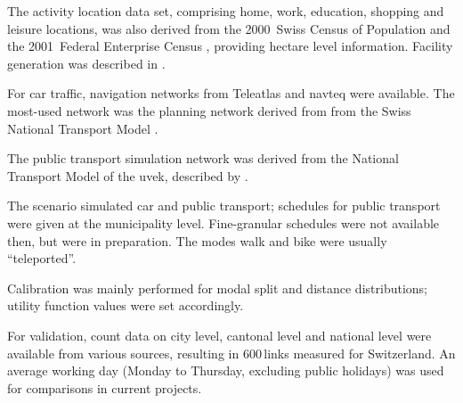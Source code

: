 The activity location data set, comprising home, work, education, shopping and leisure locations, was also derived from the 2000~Swiss Census of Population and the 2001~Federal Enterprise Census \citep[][]{SwissEnterpriseCensus_manual_2001}, providing hectare level information. Facility generation was described in \citet[][p.33]{BalmerEtAl_ResRep_bdktzrh_2009}.

For car traffic, navigation networks from Teleatlas \citep[][]{MultiNet_Webpage_2010} and \gls{navteq} \citep[][]{Navteq_2011} were available. The most-used network was the planning network derived from from the Swiss National Transport Model \citep[][]{VrticEtAl_BiegerEtAl_2003}.

The public transport simulation network was derived from the National Transport Model of the \gls{uvek}, described by \citet[][]{VrticFroehlich_ResRep_UVEK_2010}. 

The scenario simulated car and public transport; schedules for public transport were given at the municipality level. Fine-granular schedules were not available then, but were in preparation. The modes walk and bike were usually ``\gls{teleported}''. 

Calibration was mainly performed for modal split and distance distributions; utility function values were set accordingly.

For validation, count data on city level, cantonal level and national level \citep[][]{ASTRA_Webpage_2006} were available from various sources, resulting in 600\,links measured for Switzerland. An average working day (Monday to Thursday, excluding public holidays) was used for comparisons in current projects.


